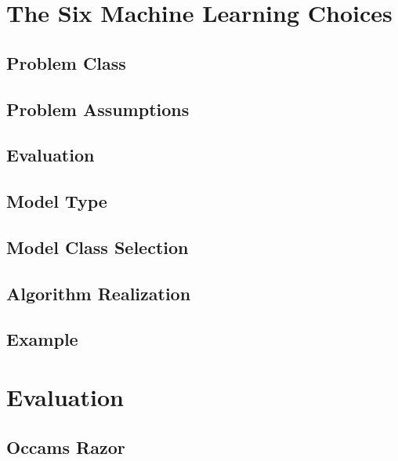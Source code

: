	\section{The Six Machine Learning Choices} %

		\subsection{Problem Class} %

		\subsection{Problem Assumptions} %

		\subsection{Evaluation} %

		\subsection{Model Type} %

		\subsection{Model Class Selection} %

		\subsection{Algorithm Realization} %

		\subsection{Example} %

	\section{Evaluation} %

		\subsection{Occams Razor} %


